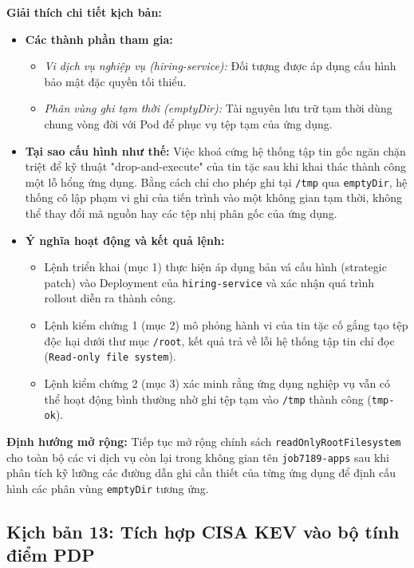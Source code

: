\textbf{Giải thích chi tiết kịch bản:}
\begin{itemize}[itemsep=4pt, parsep=0pt]
    \item \textbf{Các thành phần tham gia:}
    \begin{itemize}
        \item \textit{Vi dịch vụ nghiệp vụ (hiring-service):} Đối tượng được áp dụng cấu hình bảo mật đặc quyền tối thiểu.
        \item \textit{Phân vùng ghi tạm thời (emptyDir):} Tài nguyên lưu trữ tạm thời dùng chung vòng đời với Pod để phục vụ tệp tạm của ứng dụng.
    \end{itemize}
    \item \textbf{Tại sao cấu hình như thế:} Việc khoá cứng hệ thống tập tin gốc ngăn chặn triệt để kỹ thuật "drop-and-execute" của tin tặc sau khi khai thác thành công một lỗ hổng ứng dụng. Bằng cách chỉ cho phép ghi tại \texttt{/tmp} qua \texttt{emptyDir}, hệ thống cô lập phạm vi ghi của tiến trình vào một không gian tạm thời, không thể thay đổi mã nguồn hay các tệp nhị phân gốc của ứng dụng.
    \item \textbf{Ý nghĩa hoạt động và kết quả lệnh:} 
    \begin{itemize}
        \item Lệnh triển khai (mục 1) thực hiện áp dụng bản vá cấu hình (strategic patch) vào Deployment của \texttt{hiring-service} và xác nhận quá trình rollout diễn ra thành công.
        \item Lệnh kiểm chứng 1 (mục 2) mô phỏng hành vi của tin tặc cố gắng tạo tệp độc hại dưới thư mục \texttt{/root}, kết quả trả về lỗi hệ thống tập tin chỉ đọc (\texttt{Read-only file system}).
        \item Lệnh kiểm chứng 2 (mục 3) xác minh rằng ứng dụng nghiệp vụ vẫn có thể hoạt động bình thường nhờ ghi tệp tạm vào \texttt{/tmp} thành công (\texttt{tmp-ok}).
    \end{itemize}
\end{itemize}

\textbf{Định hướng mở rộng:} Tiếp tục mở rộng chính sách \texttt{readOnlyRootFilesystem} cho toàn bộ các vi dịch vụ còn lại trong không gian tên \texttt{job7189-apps} sau khi phân tích kỹ lưỡng các đường dẫn ghi cần thiết của từng ứng dụng để định cấu hình các phân vùng \texttt{emptyDir} tương ứng.


\subsection{Kịch bản 13: Tích hợp CISA KEV vào bộ tính điểm PDP}
\label{subsec:c3_kb13}

